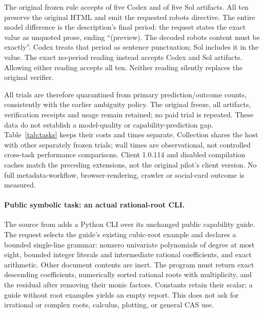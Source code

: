 The original frozen rule accepts \MetadataCodexAchieved{} of five Codex and
\MetadataSolAchieved{} of five Sol artifacts. All ten preserve the original
HTML and emit the requested robots directive. The entire model difference is
the description's final period: the request states the exact value as unquoted
prose, ending ``(preview). The decoded robots content must be exactly''.
Codex treats that period as sentence punctuation; Sol includes it in the value.
The exact no-period reading instead accepts
\MetadataCodexWithoutPeriodPassed{} Codex and
\MetadataSolWithoutPeriodPassed{} Sol artifacts. Allowing either reading accepts
all ten. Neither reading silently replaces the original verifier.

All \MetadataExecutions{} trials are therefore quarantined from primary
prediction/outcome counts, consistently with the earlier ambiguity policy.
The original freeze, all artifacts, verification receipts and usage remain
retained; no paid trial is repeated. These data do not establish a model-quality
or capability-prediction gap. Table~\ref{tab:tasks} keeps their costs
and times separate. Collection shares the host with other separately frozen
trials; wall times are observational, not controlled cross-task performance
comparisons. Client 1.0.114 and disabled compilation caches match the preceding
extensions, not the original pilot's client version. No full metadata-workflow,
browser-rendering, crawler or social-card
outcome is measured.

\paragraph{Public symbolic task: an actual rational-root CLI.}
The  source from 
adds a Python CLI over its unchanged public capability guide. The request
selects the guide's existing cubic-root example and declares a bounded
single-line grammar: nonzero univariate polynomials of degree at most eight,
bounded integer literals and intermediate rational coefficients, and exact
arithmetic. Other document contents are inert. The program must return exact
descending coefficients, numerically sorted rational roots with multiplicity,
and the residual after removing their monic factors. Constants retain their
scalar; a guide without root examples yields an empty report. This does not
ask for irrational or complex roots, calculus, plotting, or general CAS use.

